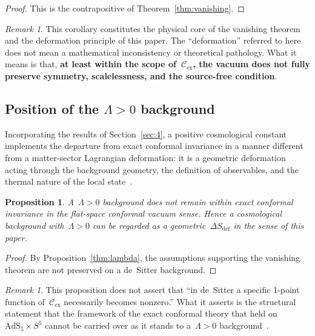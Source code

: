 \documentclass[
  aps,
  prd,
  preprint,
  groupedaddress,
  nofootinbib,
  longbibliography
]{revtex4-2}
\newtheorem{proposition}[definition]{Proposition}
\theoremstyle{remark}
\newtheorem{remark}[definition]{Remark}
\newcommand{\Cex}{\mathcal{C}_{\mathrm{ex}}}
\newcommand{\AdS}{\mathrm{AdS}}
\begin{document}
\begin{proof}
This is the contrapositive of Theorem~\ref{thm:vanishing}.
\end{proof}

\begin{remark}\label{rem:converse-core}
This corollary constitutes the physical core of the vanishing
theorem and the deformation principle of this paper.
The ``deformation'' referred to here does not mean a mathematical
inconsistency or theoretical pathology.
What it means is that, \textbf{at least within the scope
of~$\Cex$, the vacuum does not fully preserve symmetry,
scalelessness, and the source-free condition}.
\end{remark}

\subsection{Position of the \texorpdfstring{$\Lambda>0$}{Lambda>0}
  background}\label{subsec:5-5}

Incorporating the results of Section~\ref{sec:4}, a positive
cosmological constant implements the departure from exact
conformal invariance in a manner different from a matter-sector
Lagrangian deformation: it is a geometric deformation acting
through the background geometry, the definition of observables,
and the thermal nature of the local
state~\cite{ref15,ref16,ref17,ref18,ref19,ref20,ref21,
  ref22,ref23,ref24,ref25,ref26,ref27}.

\begin{proposition}\label{prop:Lambda-position}
A~$\Lambda>0$ background does not remain within exact conformal
invariance in the flat-space conformal vacuum sense.
Hence a cosmological background with~$\Lambda>0$ can be regarded
as a geometric~$\Delta S_{\mathrm{def}}$ in the sense of this
paper.
\end{proposition}

\begin{proof}
By Proposition~\ref{thm:lambda}, the assumptions supporting the
vanishing theorem are not preserved on a de~Sitter background.
\end{proof}

\begin{remark}\label{rem:Lambda-not-nonzero}
This proposition does not assert that ``in de~Sitter a specific
1-point function of~$\Cex$ necessarily becomes nonzero.''
What it asserts is the structural statement that the framework
of the exact conformal theory that held on~$\AdS_5\times S^5$
cannot be carried over as it stands to a~$\Lambda>0$
background~\cite{ref15,ref16,ref17,ref18,ref19,ref20,ref21}.
\end{remark}
\end{document}
